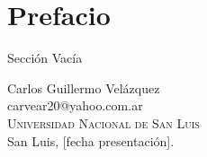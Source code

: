 
\chapter*{Prefacio}
\label{cap-Pre}

Secci\'on Vac\'ia

\vspace{5cm}
\begin{flushright}
Carlos Guillermo Vel\'azquez \\
\textsf{carvear20@yahoo.com.ar} \\
\textsc{Universidad Nacional de San Luis}\\
San Luis, [fecha presentaci\'on].
\end{flushright}
